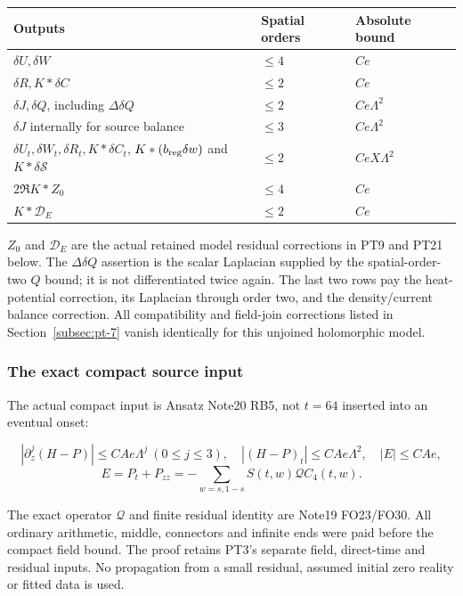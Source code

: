 \begin{theorem}
\begingroup\small
\begin{longtable}{@{}>{\raggedright\arraybackslash}p{} >{\raggedright\arraybackslash}p{} >{\raggedright\arraybackslash}p{}@{}}
\toprule
Outputs & Spatial orders & Absolute bound\\
\midrule
\endhead
$\delta U,\delta W$ & $\le4$ & $Ce$\\
$\delta R,K*\delta C$ & $\le2$ & $Ce$\\
$\delta J,\delta Q$, including $\Delta\delta Q$ & $\le2$ & $Ce\Lambda^2$\\
$\delta J$ internally for source balance & $\le3$ & $Ce\Lambda^2$\\
$\delta U_t,\delta W_t,\delta R_t,K*\delta C_t$, $K*(b_{\rm reg}\delta w)$ and $K*\delta\mathcal S$ & $\le2$ & $CeX\Lambda^2$\\
$2\Re K*Z_0$ & $\le4$ & $Ce$\\
$K*\mathcal D_E$ & $\le2$ & $Ce$\\
\bottomrule
\end{longtable}
\endgroup

$Z_0$ and \(\mathcal D_E\) are the actual retained model residual corrections in PT9 and PT21 below. The $\Delta\delta Q$ assertion is the scalar Laplacian supplied by the spatial-order-two $Q$ bound; it is not differentiated twice again. The last two rows pay the heat-potential correction, its Laplacian through order two, and the density/current balance correction. All compatibility and field-join corrections listed in Section~\ref{subsec:pt-7} vanish identically for this unjoined holomorphic model.

\end{theorem}
\subsubsection{The exact compact source input}\label{subsec:pt-1}
The actual compact input is Ansatz Note20 RB5, not \(t=64\) inserted into an eventual onset:

\[
|\partial_z^j(H-P)|\le C A e\Lambda^j\ (0\le j\le3),\quad
|(H-P)_t|\le C A e\Lambda^2,\quad |E|\le C A e,
\]
\[
E=P_t+P_{zz}=-\sum_{w=s,1-s}S(t,w)\mathscr Q C_4(t,w).
\tag{PT3}\label{eq:ansatz-pt3}
\]

The exact operator $\mathscr Q$ and finite residual identity are Note19 FO23/FO30. All ordinary arithmetic, middle, connectors and infinite ends were paid before the compact field bound. The proof retains PT3's separate field, direct-time and residual inputs. No propagation from a small residual, assumed initial zero reality or fitted data is used.

